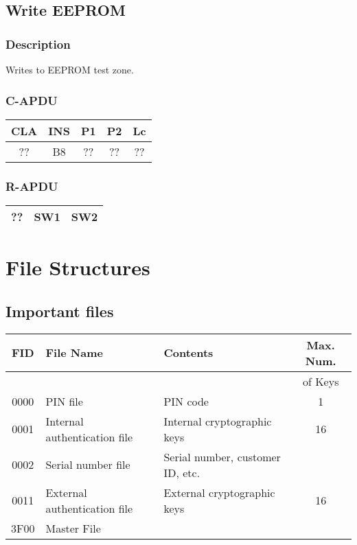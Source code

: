 \documentclass[a4paper,oneside]{article}
\begin{document}
\subsection{Write EEPROM}

\subsubsection*{Description}

Writes to EEPROM test zone.

\subsubsection*{C-APDU}

\begin{tabular}{|c|c|c|c|c|} \hline
CLA & INS & P1 & P2 & Lc \\ \hline \hline
?? & B8 & ?? & ?? & ?? \\ \hline
\end{tabular}

\subsubsection*{R-APDU}

\begin{tabular}{|c|c|c|} \hline
?? & SW1 & SW2 \\ \hline
\end{tabular}


\section{File Structures}

\subsection{Important files}

\begin{center}
\begin{tabular}{|c|l|l|c|} \hline
FID   & File Name & Contents & Max. Num. \\ \hline
      &           &          & of Keys     \\ \hline \hline
0000 & PIN file & PIN code & 1 \\ \hline
0001 & Internal authentication file & Internal cryptographic keys & 16 \\ \hline
0002 & Serial number file & Serial number, customer ID, etc. & \\ \hline
0011 & External authentication file & External cryptographic keys & 16 \\ \hline
3F00 & Master File & & \\ \hline
\end{tabular}
\end{center}
\end{document}
